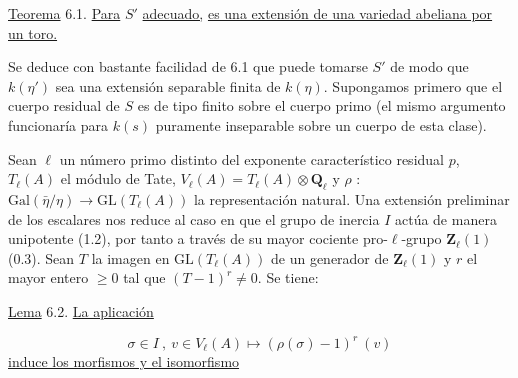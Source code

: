 
\underline{Teorema} 6.1. \underline{Para} $S'$ \underline{adecuado,}  \underline{es una extensión de una variedad abeliana por un toro.}

Se deduce con bastante facilidad de 6.1 que puede tomarse $S'$ de modo que $k(\eta')$ sea una extensión separable finita de $k(\eta)$. Supongamos primero que el cuerpo residual de $S$ es de tipo finito sobre el cuerpo primo (el mismo argumento funcionaría para $k(s)$ puramente inseparable sobre un cuerpo de esta clase).

Sean $\ell$ un número primo distinto del exponente característico residual $p$, $T_{\ell}(A)$ el módulo de Tate, $V_{\ell}(A) = T_{\ell}(A) \otimes \mathbf{Q}_{\ell}$ y $\rho$ : $\mathrm{Gal}(\bar{\eta}/\eta) \longrightarrow \mathrm{GL}(T_{\ell}(A))$ la representación natural. Una extensión preliminar de los escalares nos reduce al caso en que el grupo de inercia $I$ actúa de manera unipotente (1.2), por tanto a través de su mayor cociente pro-$\ell$-grupo $\mathbf{Z}_{\ell}(1)$ (0.3). Sean $T$ la imagen en $\mathrm{GL}(T_{\ell}(A))$ de un generador de $\mathbf{Z}_{\ell}(1)$ y $r$ el mayor entero $\geqslant 0$ tal que $(T-1)^{r} \neq 0$. Se tiene:

\underline{Lema} 6.2. \underline{La aplicación}

\begin{equation*}
\sigma \in I \ , \ v \in V_{\ell}(A) \longmapsto (\rho(\sigma)-1)^{r} \ (v)
\end{equation*}
\underline{induce los morfismos y el isomorfismo}

